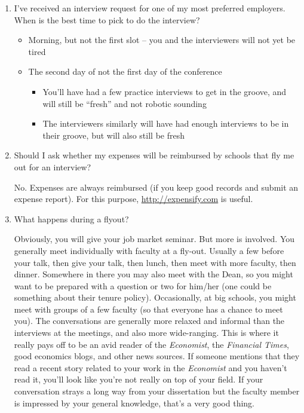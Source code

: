 \documentclass{econtex}
\begin{document}
\begin{enumerate}
\item I've received an interview request for one of my most preferred employers. When is the best time to pick to do the interview?
  \begin{itemize}
  \item Morning, but not the first slot -- you and the interviewers will not yet be tired
  \item The second day of not the first day of the conference
    \begin{itemize}
    \item You'll have had a few practice interviews to get in the groove, and will still be ``fresh'' and not robotic sounding
    \item The interviewers similarly will have had enough interviews to be in their groove, but will also still be fresh
    \end{itemize}
  \end{itemize}

\item Should I ask whether my expenses will be reimbursed by schools that fly me out for an interview?

No.  Expenses are always reimbursed (if you keep good records and submit an expense report).  For this purpose, \url{http://expensify.com} is useful.

\item What happens during a flyout?

  Obviously, you will give your job market seminar.  But more is
  involved.  You generally meet individually with faculty at a
  fly-out.  Usually a few before your talk, then give your talk, then
  lunch, then meet with more faculty, then dinner.  Somewhere in there
  you may also meet with the Dean, so you might want to be prepared
  with a question or two for him/her (one could be something about
  their tenure policy).  Occasionally, at big schools, you might meet
  with groups of a few faculty (so that everyone has a chance to meet
  you).  The conversations are generally more relaxed and informal
  than the interviews at the meetings, and also more wide-ranging.
  This is where it really pays off to be an avid reader of the {\it Economist},
the {\it Financial Times}, good economics blogs, and other news sources.
If someone mentions that they read a recent story related to your 
work in the {\it Economist} and you haven't read it, you'll look like
you're not really on top of your field.  If your conversation strays
a long way from your dissertation but the faculty member is impressed 
by your general knowledge, that's a very good thing.


\end{enumerate}
\end{document}
